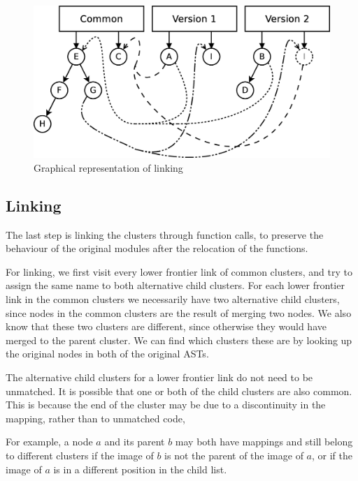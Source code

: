 \begin{figure}
\centering
\includegraphics[width=1\textwidth]{figures/automatic_beh_inf/diagrams/dia5}
\par

\caption{Graphical representation of linking\label{fig:cluster-linking-example}}

\end{figure}

\subsection{Linking\label{sub:cluster-linking}}

The last step is linking the clusters through function calls, to preserve
the behaviour of the original modules after the relocation of the
functions.

For linking, we first visit every lower frontier link of common clusters,
and try to assign the same name to both alternative child clusters.
For each lower frontier link in the common clusters we necessarily have
two alternative child clusters, since nodes in the common clusters
are the result of merging two nodes. We also know that these two clusters
are different, since otherwise they would have merged to the parent
cluster. We can find which clusters these are by looking up the original
nodes in both of the original ASTs.

The alternative child clusters for a lower frontier link do not need to
be unmatched. It is possible that one or both of the child clusters
are also common. This is because the end of the cluster may be due
to a discontinuity in the mapping, rather than to unmatched code,

For example, a node $a$ and its parent $b$ may both have mappings and still
belong to different clusters if the image of $b$ is not the parent
of the image of $a$, or if the image of $a$ is in a different position
in the child list.

